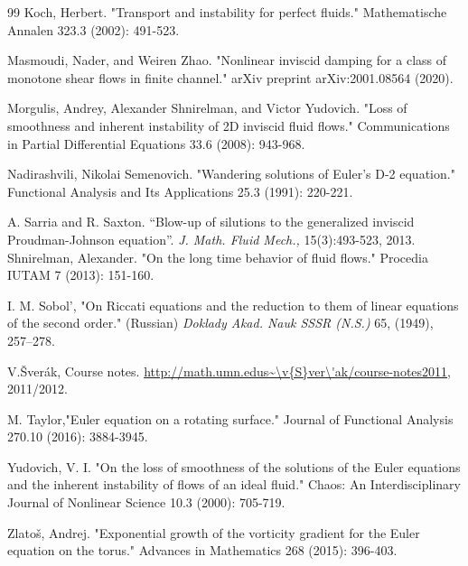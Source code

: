\documentclass[10pt]{article}
\numberwithin{equation}{section}
\theoremstyle{plain}
\theoremstyle{definition}
\numberwithin{equation}{section}
\begin{document}
\begin{thebibliography}{99}
Koch, Herbert. "Transport and instability for perfect fluids." Mathematische Annalen 323.3 (2002): 491-523.


Masmoudi, Nader, and Weiren Zhao. "Nonlinear inviscid damping for a class of monotone shear flows in finite channel." arXiv preprint arXiv:2001.08564 (2020).

Morgulis, Andrey, Alexander Shnirelman, and Victor Yudovich. "Loss of smoothness and inherent instability of 2D inviscid fluid flows." Communications in Partial Differential Equations 33.6 (2008): 943-968.


Nadirashvili, Nikolai Semenovich. "Wandering solutions of Euler's D-2 equation." Functional Analysis and Its Applications 25.3 (1991): 220-221.

A. Sarria and R. Saxton.
``Blow-up of silutions to the generalized inviscid Proudman-Johnson equation''. {\it J. Math. Fluid Mech., }15(3):493-523, 2013.
Shnirelman, Alexander. "On the long time behavior of fluid flows." Procedia IUTAM 7 (2013): 151-160.

I. M. Sobol',
"On Riccati equations and the reduction to them of linear equations of the second order." (Russian) {\it Doklady Akad. Nauk SSSR (N.S.)} 65, (1949), 257–278.

V.\v{S}ver\'ak, Course notes. \url{http://math.umn.edus\~\v{S}ver\'ak/course-notes2011}, 2011/2012.

M. Taylor,"Euler equation on a rotating surface." Journal of Functional Analysis 270.10 (2016): 3884-3945.

Yudovich, V. I. "On the loss of smoothness of the solutions of the Euler equations and the inherent instability of flows of an ideal fluid." Chaos: An Interdisciplinary Journal of Nonlinear Science 10.3 (2000): 705-719.

Zlatoš, Andrej. "Exponential growth of the vorticity gradient for the Euler equation on the torus." Advances in Mathematics 268 (2015): 396-403.

\end{thebibliography}
\end{document}

